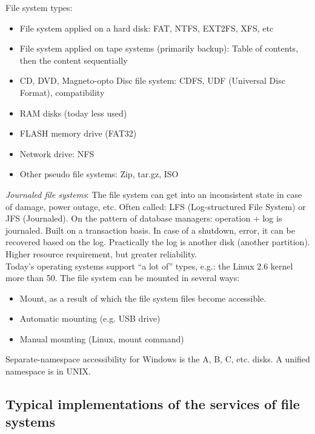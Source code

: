 \documentclass[margin=0px]{article}
\begin{document}
File system types:
\begin{itemize}
    \item File system applied on a hard disk: FAT, NTFS, EXT2FS, XFS, etc
    \item File system applied on tape systems (primarily backup): Table of contents, then the content sequentially
    \item CD, DVD, Magneto-opto Disc file system: CDFS, UDF (Universal Disc Format), compatibility
    \item RAM disks (today less used)
    \item FLASH memory drive (FAT32)
    \item Network drive: NFS
    \item Other pseudo file systems: Zip, tar.gz, ISO
\end{itemize}

\textit{Journaled file systems}: The file system can get into an inconsistent state in case of damage, power outage, etc. Often called: LFS (Log-structured File System) or JFS (Journaled). On the pattern of database managers: operation + log is journaled. Built on a transaction basis. In case of a shutdown, error, it can be recovered based on the log. Practically the log is another disk (another partition). Higher resource requirement, but greater reliability. \\
Today's operating systems support ``a lot of'' types, e.g.: the Linux 2.6 kernel more than 50.
The file system can be mounted in several ways:
\begin{itemize}
    \item Mount, as a result of which the file system files become accessible.
    \item Automatic mounting (e.g. USB drive)
    \item Manual mounting (Linux, mount command)
\end{itemize}
Separate-namespace accessibility for Windows is the A, B, C, etc. disks. A unified namespace is in UNIX.

\subsection{Typical implementations of the services of file systems}
\end{document}
